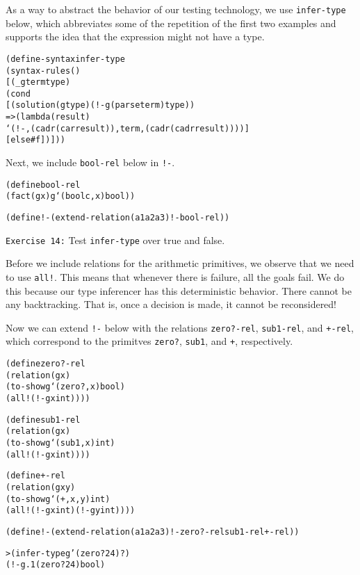 As a way to abstract the behavior of our testing technology, we
use \texttt{infer-type} below, which abbreviates some of the
repetition of the first two examples and supports the idea that
the expression might not have a type.

\begin{alltt}
(define-syntax infer-type
  (syntax-rules ()
    [(_ g term type)
     (cond
       [(solution (g type) (!- g (parse term) type))
        => (lambda (result)
             `(!- ,(cadr (car result)) ,term ,(cadr (cadr result))))]
       [else #f])]))
\end{alltt}

Next, we include \texttt{bool-rel} below in \texttt{!-}.
\begin{alltt}
(define bool-rel
  (fact (g x) g `(boolc ,x) bool))

(define !- (extend-relation (a1 a2 a3) !- bool-rel))
\end{alltt}
\noindent
\texttt{Exercise 14:} Test \texttt{infer-type} over true and false.\endofexercise

Before we include relations for the arithmetic primitives, we observe
that we need to use \texttt{all!}.  This means that whenever there is
failure, all the goals fail.  We do this because our type
inferencer has this deterministic behavior.  There cannot be any
backtracking.  That is, once a decision is made, it cannot be
reconsidered!

Now we can extend \texttt{!-} below with the relations
\texttt{zero?-rel}, \texttt{sub1-rel}, and \texttt{+-rel}, which
correspond to the primitves \texttt{zero?}, \texttt{sub1}, and
\texttt{+}, respectively.

\begin{alltt}
(define zero?-rel
  (relation (g x)
    (to-show g `(zero? ,x) bool)
    (all! (!- g x int))))

(define sub1-rel
  (relation (g x)
    (to-show g `(sub1 ,x) int)
    (all! (!- g x int))))

(define +-rel
  (relation (g x y)
    (to-show g `(+ ,x ,y) int)
    (all! (!- g x int) (!- g y int))))
\end{alltt}

\begin{alltt}
(define !- (extend-relation (a1 a2 a3) !- zero?-rel sub1-rel +-rel))
\end{alltt}

\begin{alltt}
> (infer-type g '(zero? 24) ?)
(!- g.1 (zero? 24) bool)
\end{alltt}

